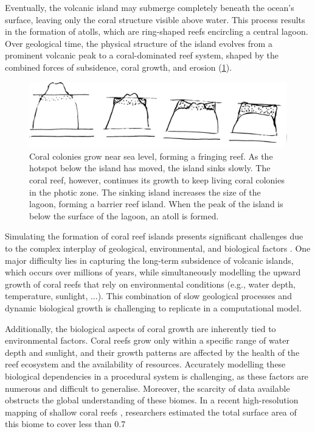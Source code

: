 Eventually, the volcanic island may submerge completely beneath the ocean's surface, leaving only the coral structure visible above water. This process results in the formation of atolls, which are ring-shaped reefs encircling a central lagoon. Over geological time, the physical structure of the island evolves from a prominent volcanic peak to a coral-dominated reef system, shaped by the combined forces of subsidence, coral growth, and erosion (\cref{fig:coral-island-reef-growth}).

\begin{figure}[H]
    \includegraphics[width = \linewidth]{other_images/Drawings/Darwin_corals.jpg}
    \caption{Coral colonies grow near sea level, forming a fringing reef. As the hotspot below the island has moved, the island sinks slowly. The coral reef, however, continues its growth to keep living coral colonies in the photic zone. The sinking island increases the size of the lagoon, forming a barrier reef island. When the peak of the island is below the surface of the lagoon, an atoll is formed.}
    \label{fig:coral-island-reef-growth}
\end{figure}

Simulating the formation of coral reef islands presents significant challenges due to the complex interplay of geological, environmental, and biological factors \cite{Hopley2014}. One major difficulty lies in capturing the long-term subsidence of volcanic islands, which occurs over millions of years, while simultaneously modelling the upward growth of coral reefs that rely on environmental conditions (e.g., water depth, temperature, sunlight, ...). This combination of slow geological processes and dynamic biological growth is challenging to replicate in a computational model.

Additionally, the biological aspects of coral growth are inherently tied to environmental factors. Coral reefs grow only within a specific range of water depth and sunlight, and their growth patterns are affected by the health of the reef ecosystem and the availability of resources. Accurately modelling these biological dependencies in a procedural system is challenging, as these factors are numerous and difficult to generalise. Moreover, the scarcity of data available obstructs the global understanding of these biomes. In a recent high-resolution mapping of shallow coral reefs \cite{Lyons2024}, researchers estimated the total surface area of this biome to cover less than 0.7%

